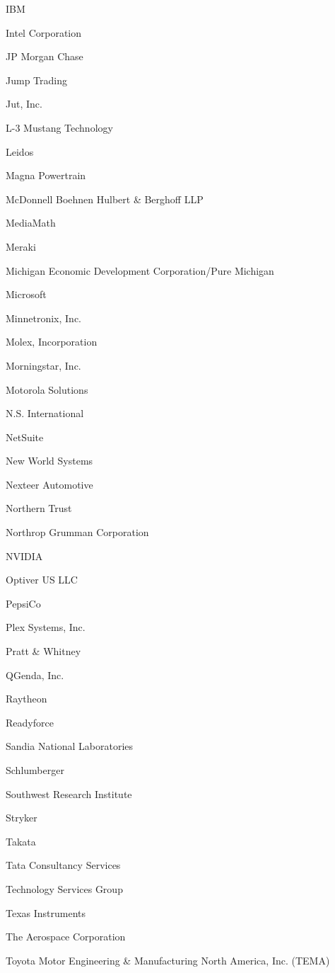 \documentclass[twoside]{article}
\begin{document}
\begin{center}
\begin{multicols}{5}
\begin{FlushLeft}
\begin{compactitem}
\item IBM
\item Intel Corporation
\item JP Morgan Chase
\item Jump Trading
\item Jut, Inc.
\item L-3 Mustang Technology
\item Leidos
\item Magna Powertrain
\item McDonnell Boehnen Hulbert \& Berghoff LLP
\item MediaMath
\item Meraki
\item Michigan Economic Development Corporation/Pure Michigan
\item Microsoft
\item Minnetronix, Inc.
\item Molex, Incorporation
\item Morningstar, Inc.
\item Motorola Solutions
\item N.S. International
\item NetSuite
\item New World Systems
\item Nexteer Automotive
\item Northern Trust
\item Northrop Grumman Corporation
\item NVIDIA
\item Optiver US LLC
\item PepsiCo
\item Plex Systems, Inc.
\item Pratt \& Whitney
\item QGenda, Inc.
\item Raytheon
\item Readyforce
\item Sandia National Laboratories
\item Schlumberger
\item Southwest Research Institute
\item Stryker
\item Takata
\item Tata Consultancy Services
\item Technology Services Group
\item Texas Instruments
\item The Aerospace Corporation
\item Toyota Motor Engineering \& Manufacturing North America, Inc. (TEMA)

\end{compactitem}
\end{FlushLeft}
\end{multicols}
\end{center}
\end{document}

